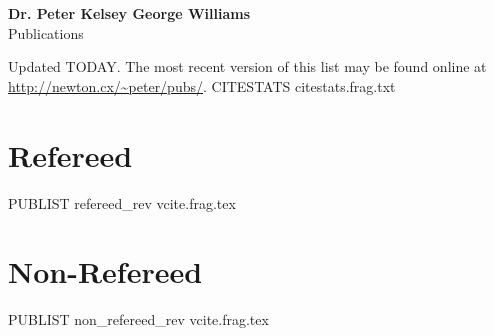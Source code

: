 \documentclass[letterpaper,11pt]{article}
\newenvironment{publist}{
  \begingroup
  \raggedright
  \begin{description}[leftmargin=4ex,style=sameline]
}{
  \end{description}
  \endgroup
}
\begin{document}
\pagestyle{fancy}
\lhead{} \chead{} \rhead{} \renewcommand{\headrule}{\relax}
\cfoot{\thepage/\pageref*{LastPage}}

\begin{center}
\textbf{\Large Dr. Peter Kelsey George Williams} \\
{\large Publications}
\end{center}

\noindent Updated
TODAY.
The most recent version of this list may be found online at
\url{http://newton.cx/~peter/pubs/}.
CITESTATS citestats.frag.txt

\section*{Refereed}

\begin{publist}
PUBLIST refereed_rev vcite.frag.tex
\end{publist}

\section*{Non-Refereed}

\begin{publist}
PUBLIST non_refereed_rev vcite.frag.tex
\end{publist}
\end{document}
